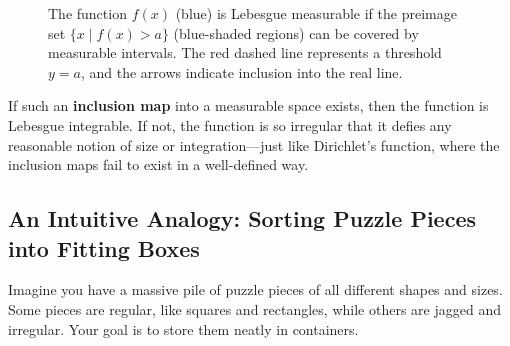 \begin{figure}[h]
    \centering
\caption{The function \( f(x) \) (blue) is Lebesgue measurable if the preimage set \( \{ x \mid f(x) > a \} \) (blue-shaded regions) can be covered by measurable intervals. The red dashed line represents a threshold \( y = a \), and the arrows indicate inclusion into the real line.}
\end{figure}


If such an \textbf{inclusion map} into a measurable space exists, then the function is Lebesgue integrable. If not, the function is so irregular that it defies any reasonable notion of size or integration—just like Dirichlet’s function, where the inclusion maps fail to exist in a well-defined way.

\subsection{An Intuitive Analogy: Sorting Puzzle Pieces into Fitting Boxes}

Imagine you have a massive pile of puzzle pieces of all different shapes and sizes. Some pieces are regular, like squares and rectangles, while others are jagged and irregular. Your goal is to store them neatly in containers.

